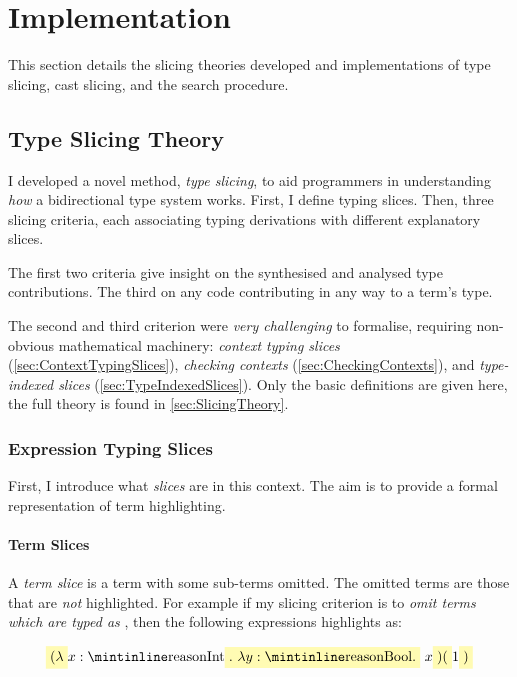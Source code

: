 \chapter{Implementation}\label{chap:Implementation}
This section details the slicing theories developed and implementations of type slicing, cast slicing, and the search procedure.

\section{Type Slicing Theory}\label{sec:TypeSlicingTheory}
I developed a novel method, \textit{type slicing}, to aid programmers in understanding \textit{how} a bidirectional type system works. First, I define typing slices. Then, three slicing criteria, each associating typing derivations with different explanatory slices. 

The first two criteria give insight on the synthesised and analysed type contributions. The third on any code contributing in any way to a term's type.

The second and third criterion were \textit{very challenging} to formalise, requiring non-obvious mathematical machinery: \textit{context typing slices} (\cref{sec:ContextTypingSlices}), \textit{checking contexts} (\cref{sec:CheckingContexts}), and \textit{type-indexed slices} (\cref{sec:TypeIndexedSlices}). Only the basic definitions are given here, the full theory is found in \cref{sec:SlicingTheory}.

\subsection{Expression Typing Slices}\label{sec:ExpressionTypingSlices}
First, I introduce what \textit{slices} are in this context. The aim is to provide a formal representation of term highlighting. 

\subsubsection{Term Slices}
A \textit{term slice} is a term with some sub-terms omitted. The omitted terms are those that are \textit{not} highlighted. For example if my slicing criterion is to \textit{omit terms which are typed as} , then the following expressions highlights as:

\[\hlcmaths[yellow!30]{(\lambda} x: \code{Int}\hlcmaths[yellow!30]{.\ \lambda y : \code{Bool}.}\ x\hlcmaths[yellow!30]{)(}1\hlcmaths[yellow!30]{)}\]


